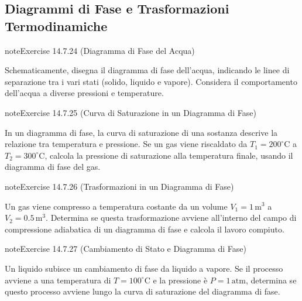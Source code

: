 \documentclass[letterpaper,10pt,italian]{jupyterBook}
\begin{document}
\subsection{Diagrammi di Fase e Trasformazioni Termodinamiche}
\label{\detokenize{ch/thermodynamics/principles-problems:diagrammi-di-fase-e-trasformazioni-termodinamiche}} \label{exercise:ch/thermodynamics/principles-problems-exercise-23}

\begin{sphinxadmonition}{note}{Exercise 14.7.24 (Diagramma di Fase del Acqua)}



\sphinxAtStartPar
Schematicamente, disegna il diagramma di fase dell’acqua, indicando le linee di separazione tra i vari stati (solido, liquido e vapore). Considera il comportamento dell’acqua a diverse pressioni e temperature.
\end{sphinxadmonition}
 \label{exercise:ch/thermodynamics/principles-problems-exercise-24}

\begin{sphinxadmonition}{note}{Exercise 14.7.25 (Curva di Saturazione in un Diagramma di Fase)}



\sphinxAtStartPar
In un diagramma di fase, la curva di saturazione di una sostanza descrive la relazione tra temperatura e pressione. Se un gas viene riscaldato da \(T_1 = 200^\circ \text{C}\) a \(T_2 = 300^\circ \text{C}\), calcola la pressione di saturazione alla temperatura finale, usando il diagramma di fase del gas.
\end{sphinxadmonition}
 \label{exercise:ch/thermodynamics/principles-problems-exercise-25}

\begin{sphinxadmonition}{note}{Exercise 14.7.26 (Trasformazioni in un Diagramma di Fase)}



\sphinxAtStartPar
Un gas viene compresso a temperatura costante da un volume \(V_1 = 1 \, \text{m}^3\) a \(V_2 = 0.5 \, \text{m}^3\). Determina se questa trasformazione avviene all’interno del campo di compressione adiabatica di un diagramma di fase e calcola il lavoro compiuto.
\end{sphinxadmonition}
 \label{exercise:ch/thermodynamics/principles-problems-exercise-26}

\begin{sphinxadmonition}{note}{Exercise 14.7.27 (Cambiamento di Stato e Diagramma di Fase)}



\sphinxAtStartPar
Un liquido subisce un cambiamento di fase da liquido a vapore. Se il processo avviene a una temperatura di \(T = 100^\circ \text{C}\) e la pressione è \(P = 1 \, \text{atm}\), determina se questo processo avviene lungo la curva di saturazione del diagramma di fase.
\end{sphinxadmonition}
 \label{exercise:ch/thermodynamics/principles-problems-exercise-27}
\end{document}
